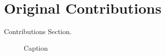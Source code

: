 \section{Original Contributions}
\label{sec:int_contributions}

Contributions Section.

\begin{figure}[H]
  \centering
  
  \caption{Caption}
  \label{fig:my_label}
\end{figure}
